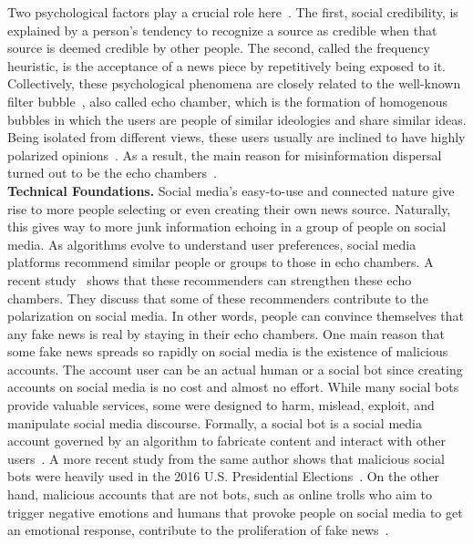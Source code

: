 Two psychological factors play a crucial role here~\parencite{TheRussianFirehoseOfFalsehood_Paul}. The first, social credibility, is explained by a person’s tendency to recognize a source as credible when that source is deemed credible by other people. The second, called the frequency heuristic, is the acceptance of a news piece by repetitively being exposed to it. Collectively, these psychological phenomena are closely related to the well-known filter bubble~\parencite{TheFilterBubble_Pariser}, also called echo chamber, which is the formation of homogenous bubbles in which the users are people of similar ideologies and share similar ideas. Being isolated from different views, these users usually are inclined to have highly polarized opinions~\parencite{EchoChambers_Sunstein}. As a result, the main reason for misinformation dispersal turned out to be the echo
chambers~\parencite{TheSpreadingOfMisinformationOnline_DelVicario}.\\
\textbf{Technical Foundations.} Social media's easy-to-use and connected nature give rise to more people selecting or even creating their own news source. Naturally, this gives way to more junk information echoing in a group of people on social media. As algorithms evolve to understand user preferences, social media platforms recommend similar people or groups to those in echo chambers. A recent study~\parencite{TheEffectOfPeopleRecommenderOnEchoChambers_Cinus}  shows that these recommenders can strengthen these echo chambers. They discuss that some of these recommenders contribute to the polarization on social media. In other words, people can convince themselves that any fake news is real by staying in their echo chambers. One main reason that some fake news spreads so rapidly on social media is the existence of malicious accounts. The account user can be an actual human or a social bot since creating accounts on social media is no cost and almost no effort. While many social bots provide valuable services, some were designed to harm, mislead, exploit, and manipulate social media discourse. Formally, a social bot is a social media account governed by an algorithm to fabricate content and interact with other users~\parencite{TheRiseOfSocialBots_Ferrara}. A more recent study from the same author shows that malicious social bots were heavily used in the 2016 U.S. Presidential Elections~\parencite{SocialBotsDistortThe2016USPresidentialElection_Bessi}. On the other hand, malicious accounts that are not bots, such as online trolls who aim to trigger negative emotions and humans that provoke people on social media to get an emotional response, contribute to the proliferation of fake news~\parencite{AnyoneCanBecomeATroll_Cheng}.\\
